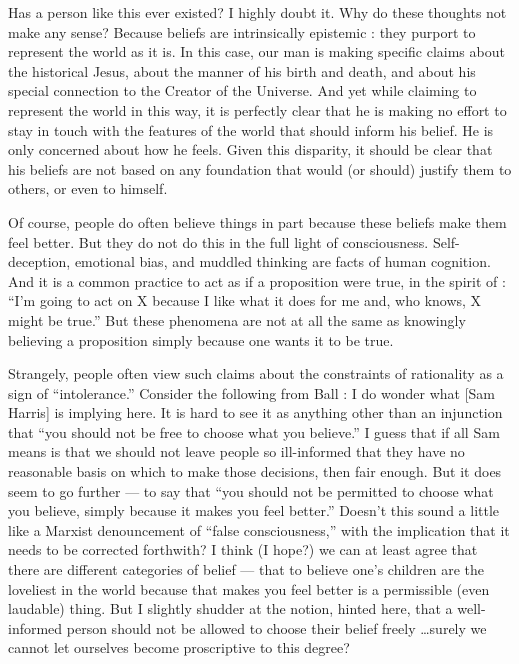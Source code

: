 \documentclass[a4paper,14pt]{extbook}
\begin{document}
Has a person like this ever existed?
I highly doubt it.
Why do these thoughts not make any sense?
Because beliefs are intrinsically epistemic :
they purport to represent the world as it is.
In this case, our man is making specific claims about the historical Jesus, about the manner of his birth and death, and about his special connection to the Creator of the Universe.
And yet while claiming to represent the world in this way, it is perfectly clear that he is making no effort to stay in touch with the features of the world that should inform his belief.
He is only concerned about how he feels.
Given this disparity, it should be clear that his beliefs are not based on any foundation that would (or should) justify them to others, or even to himself.

Of course, people do often believe things in part because these beliefs make them feel better.
But they do not do this in the full light of consciousness. Self-deception, emotional bias, and muddled thinking are facts of human cognition.
And it is a common practice to act as if a proposition were true, in the spirit of :
``I’m going to act on X because I like what it does for me and, who knows, X might be true.''
But these phenomena are not at all the same as knowingly believing a proposition simply because one wants it to be true.

Strangely, people often view such claims about the constraints of rationality as a sign of ``intolerance.''
Consider the following from Ball :
I do wonder what [Sam Harris] is implying here.
It is hard to see it as anything other than an injunction that ``you should not be free to choose what you believe.''
I guess that if all Sam means is that we should not leave people so ill-informed that they have no reasonable basis on which to make those decisions, then fair enough.
But it does seem to go further --- to say that ``you should not be permitted to choose what you believe, simply because it makes you feel better.''
Doesn’t this sound a little like a Marxist denouncement of ``false consciousness,'' with the implication that it needs to be corrected forthwith?
I think (I hope?) we can at least agree that there are different categories of belief --- that to believe one’s children are the loveliest in the world because that makes you feel better is a permissible (even laudable) thing.
But I slightly shudder at the notion, hinted here, that a well-informed person should not be allowed to choose their belief freely \dots surely we cannot let ourselves become proscriptive to this degree?
\end{document}
